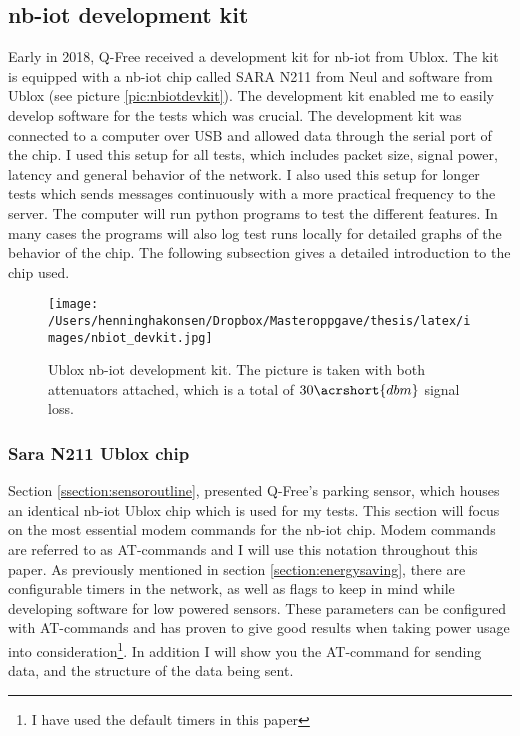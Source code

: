 \documentclass[USenglish]{ifimaster}  %
\begin{document}
\subsection{\acrshort{nb-iot} development kit}
Early in 2018, Q-Free received a development kit for \acrshort{nb-iot} from Ublox. The kit is equipped with a \acrshort{nb-iot} chip called SARA N211 from Neul and software from Ublox (see picture \vref{pic:nbiotdevkit}). The development kit enabled me to easily develop software for the tests which was crucial. The development kit was connected to a computer over USB and allowed data through the serial port of the chip. I used this setup for all tests, which includes packet size, signal power, latency and general behavior of the network. I also used this setup for longer tests which sends messages continuously with a more practical frequency to the server. The computer will run python programs to test the different features. In many cases the programs will also log test runs locally for detailed graphs of the behavior of the chip. The following subsection gives a detailed introduction to the chip used.

\begin{figure}[ht]
  \centering\texttt{[image: /Users/henninghakonsen/Dropbox/Masteroppgave/thesis/latex/images/nbiot\_devkit.jpg]}
  \caption[Closeup of Ublox \acrshort{nb-iot} development kit]{Ublox \acrshort{nb-iot} development kit. The picture is taken with both attenuators attached, which is a total of ${30\acrshort{dbm}}$ signal loss.}
  \label{pic:nbiotdevkit}
\end{figure}

\subsubsection{Sara N211 Ublox chip} \label{section:thechip}
Section \vref{ssection:sensoroutline}, presented Q-Free's parking sensor, which houses an identical \acrshort{nb-iot} Ublox chip which is used for my tests. This section will focus on the most essential modem commands for the \acrshort{nb-iot} chip. Modem commands are referred to as AT-commands and I will use this notation throughout this paper. As previously mentioned in section \vref{section:energysaving}, there are configurable timers in the network, as well as flags to keep in mind while developing software for low powered sensors. These parameters can be configured with AT-commands and has proven to give good results when taking power usage into consideration\footnote{I have used the default timers in this paper}. In addition I will show you the AT-command for sending data, and the structure of the data being sent.
\end{document}
